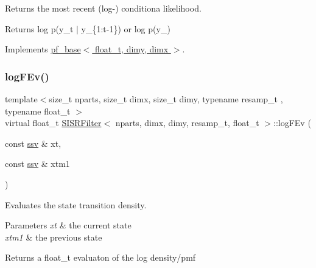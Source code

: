 Returns the most recent (log-\/) conditiona likelihood. 

\begin{DoxyReturn}{Returns}
log p(y\+\_\+t $\vert$ y\+\_\+\{1\+:t-\/1\}) or log p(y\+\_) 
\end{DoxyReturn}


Implements \hyperlink{classpf__base}{pf\+\_\+base$<$ float\+\_\+t, dimy, dimx $>$}.

\mbox{\label{classSISRFilter_a7aa1e90a0b641728d5f8d7bd8c699ba8}} 
\subsubsection{\texorpdfstring{log\+F\+Ev()}{logFEv()}}
{\footnotesize\ttfamily template$<$size\+\_\+t nparts, size\+\_\+t dimx, size\+\_\+t dimy, typename resamp\+\_\+t , typename float\+\_\+t $>$ \\
virtual float\+\_\+t \hyperlink{classSISRFilter}{S\+I\+S\+R\+Filter}$<$ nparts, dimx, dimy, resamp\+\_\+t, float\+\_\+t $>$\+::log\+F\+Ev (\begin{DoxyParamCaption}\item[{const \hyperlink{classSISRFilter_abfec45cf57ea6fadae4a9da8b0042351}{ssv} \&}]{xt,  }\item[{const \hyperlink{classSISRFilter_abfec45cf57ea6fadae4a9da8b0042351}{ssv} \&}]{xtm1 }\end{DoxyParamCaption})\hspace{0.3cm}{\ttfamily [pure virtual]}}



Evaluates the state transition density. 


\begin{DoxyParams}{Parameters}
{\em xt} & the current state \\
\hline
{\em xtm1} & the previous state \\
\hline
\end{DoxyParams}
\begin{DoxyReturn}{Returns}
a float\+\_\+t evaluaton of the log density/pmf 
\end{DoxyReturn}
\mbox{\label{classSISRFilter_a73fe8481e4cb40142544c04823851aa8}} 
